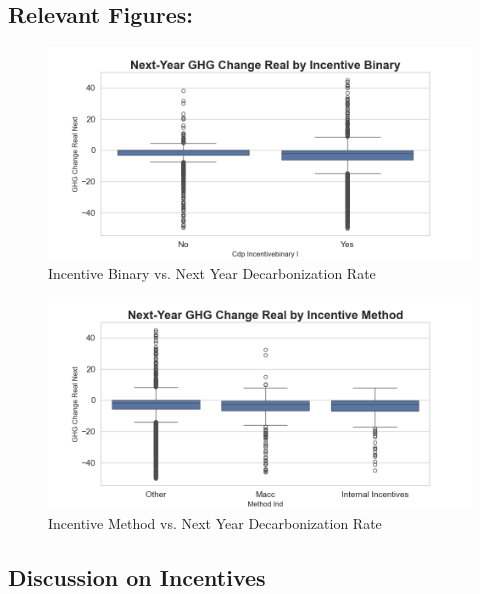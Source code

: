 \subsection{Relevant Figures:}
\begin{figure}[H]
\centering
    \includegraphics[width=\textwidth]{figures/ghg_change_real_next_by_cdp_incentivebinary_i.png}
\caption{Incentive Binary vs. Next Year Decarbonization Rate}
\label{fig:ghg_change_real_next_by_cdp_incentivebinary_i}
\end{figure}

\begin{figure}[H]
\centering
    \includegraphics[width=\textwidth]{figures/ghg_change_real_next_by_method_ind.png}
\caption{Incentive Method vs. Next Year Decarbonization Rate}
\label{fig:ghg_change_real_next_by_method_ind}
\end{figure}

\subsection{Discussion on Incentives}

